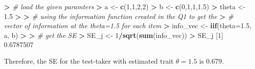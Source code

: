 \documentclass[
]{article}
\newenvironment{Shaded}{\begin{snugshade}}{\end{snugshade}}
\newcommand{\AttributeTok}[1]{\textcolor[rgb]{0.13,0.29,0.53}{#1}}
\newcommand{\CommentTok}[1]{\textcolor[rgb]{0.56,0.35,0.01}{\textit{#1}}}
\newcommand{\DecValTok}[1]{\textcolor[rgb]{0.00,0.00,0.81}{#1}}
\newcommand{\ErrorTok}[1]{\textcolor[rgb]{0.64,0.00,0.00}{\textbf{#1}}}
\newcommand{\FloatTok}[1]{\textcolor[rgb]{0.00,0.00,0.81}{#1}}
\newcommand{\FunctionTok}[1]{\textcolor[rgb]{0.13,0.29,0.53}{\textbf{#1}}}
\newcommand{\NormalTok}[1]{#1}
\newcommand{\OtherTok}[1]{\textcolor[rgb]{0.56,0.35,0.01}{#1}}
\newcommand{\SpecialCharTok}[1]{\textcolor[rgb]{0.81,0.36,0.00}{\textbf{#1}}}
\begin{document}
\begin{Shaded}
\begin{Highlighting}[]
\SpecialCharTok{\textgreater{}} \CommentTok{\# load the given paramters}
\ErrorTok{\textgreater{}}\NormalTok{ a }\OtherTok{\textless{}{-}} \FunctionTok{c}\NormalTok{(}\DecValTok{1}\NormalTok{,}\DecValTok{1}\NormalTok{,}\DecValTok{2}\NormalTok{,}\DecValTok{2}\NormalTok{)}
\SpecialCharTok{\textgreater{}}\NormalTok{ b }\OtherTok{\textless{}{-}} \FunctionTok{c}\NormalTok{(}\DecValTok{0}\NormalTok{,}\DecValTok{1}\NormalTok{,}\DecValTok{1}\NormalTok{,}\FloatTok{1.5}\NormalTok{)}
\SpecialCharTok{\textgreater{}}\NormalTok{ theta }\OtherTok{\textless{}{-}} \FloatTok{1.5}
\SpecialCharTok{\textgreater{}} 
\ErrorTok{\textgreater{}} \CommentTok{\# using the information function created in the Q1 to get the }
\ErrorTok{\textgreater{}} \CommentTok{\# vector of information at the theta=1.5 for each item}
\ErrorTok{\textgreater{}}\NormalTok{ info\_vec }\OtherTok{\textless{}{-}} \FunctionTok{iif}\NormalTok{(}\AttributeTok{theta=}\FloatTok{1.5}\NormalTok{, a, b)}
\SpecialCharTok{\textgreater{}} 
\ErrorTok{\textgreater{}} \CommentTok{\# get the SE}
\ErrorTok{\textgreater{}}\NormalTok{ SE\_j }\OtherTok{\textless{}{-}} \DecValTok{1}\SpecialCharTok{/}\FunctionTok{sqrt}\NormalTok{(}\FunctionTok{sum}\NormalTok{(info\_vec))}
\SpecialCharTok{\textgreater{}}\NormalTok{ SE\_j}
\NormalTok{[}\DecValTok{1}\NormalTok{] }\FloatTok{0.6787507}
\end{Highlighting}
\end{Shaded}

Therefore, the SE for the test-taker with estimated trait \(\theta=1.5\)
is 0.679.
\end{document}
